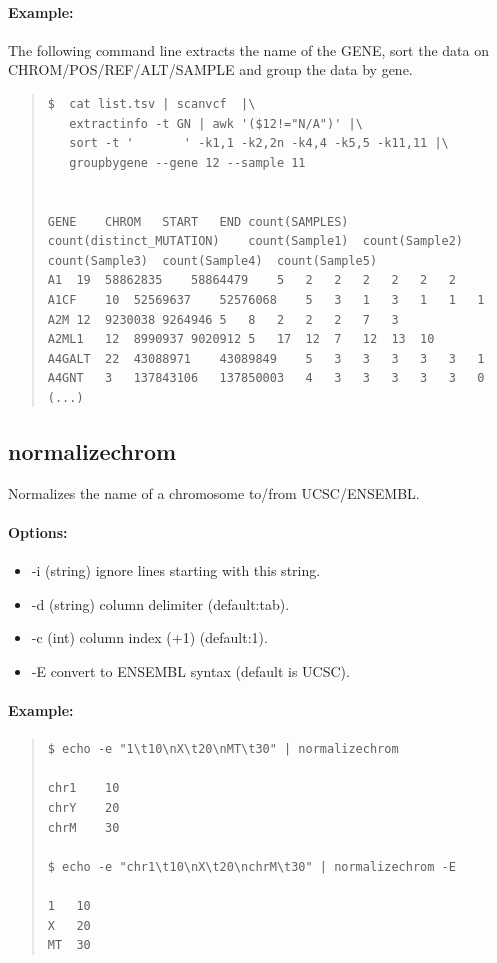 \documentclass[12pt]{article}
\begin{document}
\paragraph{Example:}
The following command line extracts the name of the GENE, sort the data on CHROM/POS/REF/ALT/SAMPLE and group the data by gene.

\begin{quote}
\begin{verbatim}
$  cat list.tsv | scanvcf  |\
   extractinfo -t GN | awk '($12!="N/A")' |\
   sort -t '       ' -k1,1 -k2,2n -k4,4 -k5,5 -k11,11 |\
   groupbygene --gene 12 --sample 11


GENE	CHROM	START	END	count(SAMPLES)	count(distinct_MUTATION)	count(Sample1)	count(Sample2)	count(Sample3)	count(Sample4)	count(Sample5)
A1	19	58862835	58864479	5	2	2	2	2	2	2
A1CF	10	52569637	52576068	5	3	1	3	1	1	1
A2M	12	9230038	9264946	5	8	2	2	2	7	3
A2ML1	12	8990937	9020912	5	17	12	7	12	13	10
A4GALT	22	43088971	43089849	5	3	3	3	3	3	1
A4GNT	3	137843106	137850003	4	3	3	3	3	3	0
(...)
\end{verbatim}
\end{quote}

\subsection{normalizechrom}
Normalizes the name of a chromosome to/from UCSC/ENSEMBL.
\paragraph{Options:}
\begin{itemize}
\item-i (string) ignore lines starting with this string.
\item-d (string) column delimiter (default:tab).
\item-c (int) column index (+1) (default:1).
\item-E convert to ENSEMBL syntax (default is UCSC).
\end{itemize}
\paragraph{Example:}
\begin{quote}
\begin{verbatim}
$ echo -e "1\t10\nX\t20\nMT\t30" | normalizechrom 

chr1	10
chrY	20
chrM	30

$ echo -e "chr1\t10\nX\t20\nchrM\t30" | normalizechrom -E

1	10
X	20
MT	30
\end{verbatim}
\end{quote}
\end{document}
